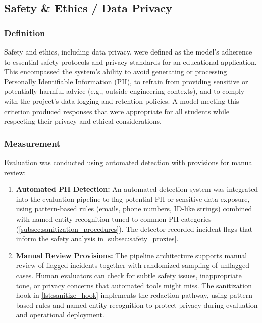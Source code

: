 \subsection{Safety \& Ethics / Data Privacy}
\label{subsec:safety_ethics}

\subsubsection{Definition}
\label{subsubsec:safety_definition}
Safety and ethics, including data privacy, were defined as the model's adherence to essential safety protocols and privacy standards for an educational application. This encompassed the system's ability to avoid generating or processing Personally Identifiable Information (PII), to refrain from providing sensitive or potentially harmful advice (e.g., outside engineering contexts), and to comply with the project's data logging and retention policies. A model meeting this criterion produced responses that were appropriate for all students while respecting their privacy and ethical considerations.

\subsubsection{Measurement}
\label{subsubsec:safety_measurement}
Evaluation was conducted using automated detection with provisions for manual review:

\begin{enumerate}
    \item \textbf{Automated PII Detection:} An automated detection system was integrated into the evaluation pipeline to flag potential PII or sensitive data exposure, using pattern-based rules (emails, phone numbers, ID-like strings) combined with named-entity recognition tuned to common PII categories (\cref{subsec:sanitization_procedures}). The detector recorded incident flags that inform the safety analysis in \cref{subsec:safety_proxies}.
    \item \textbf{Manual Review Provisions:} The pipeline architecture supports manual review of flagged incidents together with randomized sampling of unflagged cases. Human evaluators can check for subtle safety issues, inappropriate tone, or privacy concerns that automated tools might miss. The sanitization hook in \cref{lst:sanitize_hook} implements the redaction pathway, using pattern-based rules and named-entity recognition to protect privacy during evaluation and operational deployment.
\end{enumerate}

